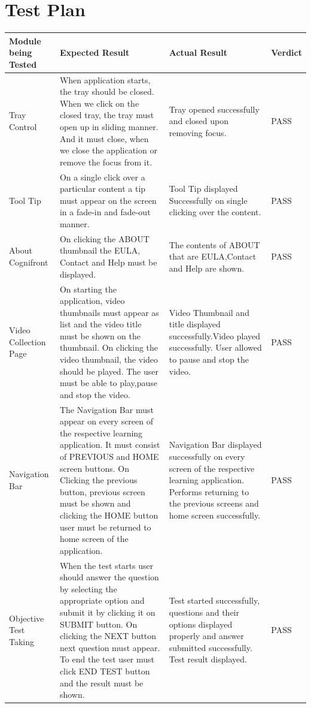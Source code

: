 \documentclass[openany,12pt]{report}
\begin{document}
\section{Test Plan}
\begin{longtable}{|p{3.5cm}|p{5cm}|p{3.5cm}|p{1.7cm}|} \hline
\textbf{Module being Tested}	&\textbf{Expected Result}	&\textbf{Actual Result}	&\textbf{Verdict} \\\hline\hline
Tray Control	&When application starts, the tray should be closed. When we click on the closed tray, the tray must open up in sliding manner. And it must close, when we close the application or remove the focus from it. 	 &Tray opened successfully and closed upon removing focus. &PASS\\\hline
Tool Tip &On a single click over a particular content a tip must appear on the screen in a fade-in and fade-out manner. &Tool Tip displayed Successfully on single clicking over the content. &PASS \\\hline
About Cognifront &On clicking the ABOUT thumbnail the EULA, Contact and Help must be displayed. &The contents of ABOUT that are EULA,Contact and Help are shown. &PASS \\\hline
Video Collection Page &On starting the application, video thumbnails must appear as list and the video title must be shown on the thumbnail. On clicking the video thumbnail, the video should be played. The user must be able to play,pause and stop the video. &Video Thumbnail and title displayed successfully.Video played successfully. User allowed to pause and stop the video. &PASS \\\hline
Navigation Bar &The Navigation Bar must appear on every screen of the respective learning application. It must consist of PREVIOUS and HOME screen buttons. On Clicking the previous button, previous screen must be shown and clicking the HOME button user must be returned to home screen of the application. &Navigation Bar displayed successfully on every screen of the respective learning application. Performs returning to the previous screens and home screen successfully. &PASS \\\hline
Objective Test Taking &When the test starts user should answer the question by selecting the appropriate option and submit it by clicking it on SUBMIT button.  On clicking the NEXT button next question must appear. To end the test user must click END TEST button and the result must be shown. &Test started successfully, questions and their options displayed properly and answer submitted successfully. Test result displayed. &PASS \\\hline

\end{longtable}
\end{document}

